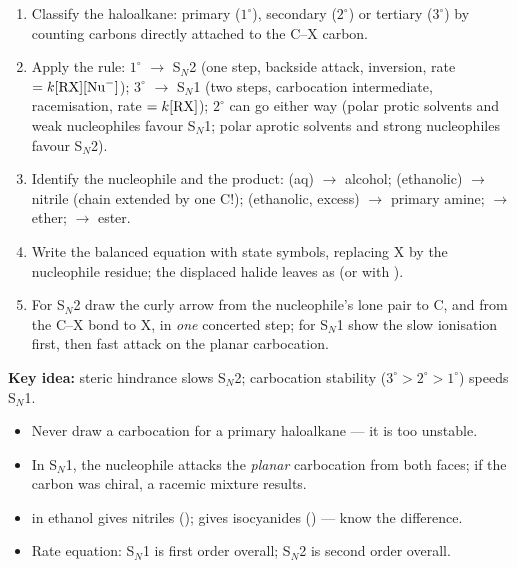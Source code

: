 \documentclass[11pt]{article}
\newcommand{\cle}[1]{{\popxbold\color{popdark}#1}}
\begin{document}
\begin{methode}
\begin{enumerate}
\item Classify the haloalkane: \cle{primary} ($1^\circ$), \cle{secondary} ($2^\circ$) or \cle{tertiary} ($3^\circ$) by counting carbons directly attached to the C--X carbon.
\item Apply the rule: $1^\circ$ $\rightarrow$ \cle{S$_N$2} (one step, backside attack, inversion, rate $= k[\ce{RX}][\ce{Nu^-}]$); $3^\circ$ $\rightarrow$ \cle{S$_N$1} (two steps, carbocation intermediate, racemisation, rate $= k[\ce{RX}]$); $2^\circ$ can go either way (polar protic solvents and weak nucleophiles favour S$_N$1; polar aprotic solvents and strong nucleophiles favour S$_N$2).
\item Identify the nucleophile and the product:  (aq) $\rightarrow$ alcohol;  (ethanolic) $\rightarrow$ nitrile (chain extended by one C!);  (ethanolic, excess) $\rightarrow$ primary amine;  $\rightarrow$ ether;  $\rightarrow$ ester.
\item Write the balanced equation with state symbols, replacing X by the nucleophile residue; the displaced halide leaves as  (or  with ).
\item For S$_N$2 draw the curly arrow from the nucleophile's lone pair to C, and from the C--X bond to X, in \emph{one} concerted step; for S$_N$1 show the slow ionisation first, then fast attack on the planar carbocation.
\end{enumerate}
\textbf{Key idea:} steric hindrance slows S$_N$2; carbocation stability ($3^\circ > 2^\circ > 1^\circ$) speeds S$_N$1.
\end{methode}

\begin{attention}
\begin{itemize}
\item Never draw a carbocation for a primary haloalkane --- it is too unstable.
\item In S$_N$1, the nucleophile attacks the \emph{planar} carbocation from both faces; if the carbon was chiral, a racemic mixture results.
\item {} in ethanol gives nitriles ();  gives isocyanides () --- know the difference.
\item Rate equation: S$_N$1 is first order overall; S$_N$2 is second order overall.
\end{itemize}
\end{attention}
\end{document}
